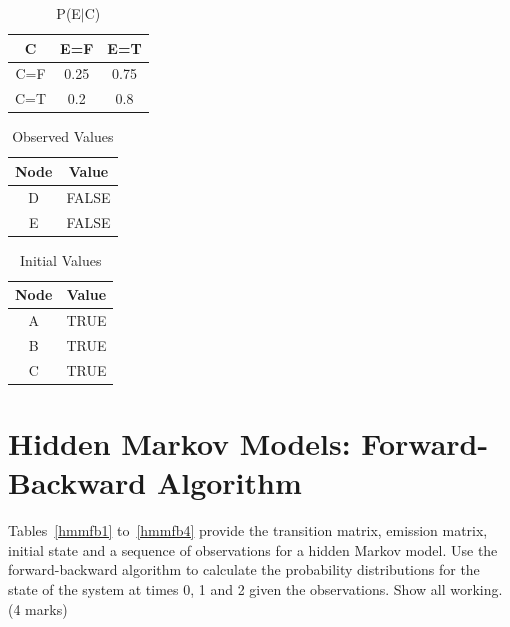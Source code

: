 \documentclass{article}
\begin{document}
\begin{table}[h!]
\caption{P(E$|$C)}
\label{MCMC5}
\begin{center}
\begin{tabular}{ |c||c|c| } 
\hline
 C & E=F & E=T\\
\hline
 C=F & 0.25 & 0.75\\
 C=T & 0.2 & 0.8\\
\hline
\end{tabular}
\end{center}
\end{table}
\begin{table}[h!]
\caption{Observed Values}
\label{MCMC6}
\begin{center}
\begin{tabular}{ |c|c| } 
\hline
 Node & Value \\
\hline
D & FALSE\\
E & FALSE\\
\hline
\end{tabular}
\end{center}
\end{table}
\begin{table}[h!]
\caption{Initial Values}
\label{MCMC7}
\begin{center}
\begin{tabular}{ |c|c| } 
\hline
 Node  & Value \\
\hline
A & TRUE\\
B & TRUE\\
C & TRUE\\
\hline
\end{tabular}
\end{center}
\end{table}
\clearpage
\section{Hidden Markov Models: Forward-Backward Algorithm}

Tables~\ref{hmmfb1} to~\ref{hmmfb4} provide the transition matrix, emission matrix, initial state and a sequence of observations for a hidden Markov model. Use the forward-backward algorithm to calculate the probability distributions for the state of the system at times 0, 1 and 2 given the observations. Show all working. (4 marks)
\end{document}
